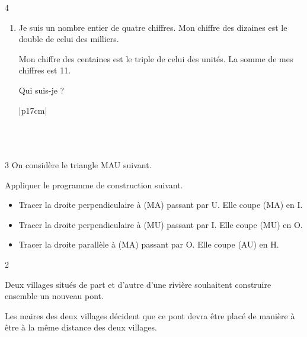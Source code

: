 \documentclass[a4paper]{book}
\begin{document}
{\begin{exerciceNote}{4}
\begin{enumerate}[leftmargin=*]
            \item Je suis un nombre entier de quatre chiffres. Mon chiffre des dizaines est le double de celui des milliers.
            
            \og Mon chiffre des centaines est le triple de celui des unités. La somme de mes chiffres est 11.\fg 
            
            Qui suis-je ?

            \begin{tabular}{|p{17cm}|}
                \hline \\ \\ \\ \\ \hline            
            \end{tabular}
        \end{enumerate}
    \end{exerciceNote}


    \begin{exerciceNote}{3}
        On considère le triangle MAU suivant.

        Appliquer le programme de construction suivant.

        \begin{itemize}
            \item Tracer la droite perpendiculaire à (MA) passant par U. Elle coupe (MA) en I.
            \item Tracer la droite perpendiculaire à (MU) passant par I. Elle coupe (MU) en O.
            \item Tracer la droite parallèle à (MA) passant par O. Elle coupe (AU) en H.        
        \end{itemize}

        \begin{center}
        \end{center}
        
    \end{exerciceNote}


\newpage


    \begin{exerciceNote}{2}
        \begin{minipage}{0.5\linewidth}
            Deux villages situés de part et d’autre d’une rivière souhaitent construire ensemble un nouveau pont. 

            Les maires des deux villages décident que ce pont devra être placé de manière à être à la même distance des deux villages. 
            

\end{minipage}
\end{exerciceNote}}
\end{document}
